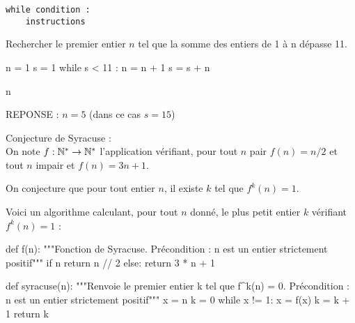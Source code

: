 \begin{lstlisting}
while condition :
    instructions
\end{lstlisting}



\vspace{0.5cm}
\label{ex-suite}
Rechercher le premier entier $n$ tel que la somme des entiers de 1 à n dépasse 11.

\begin{pyconsole}
n = 1
s = 1
while s < 11 :
    n = n + 1
    s = s + n
    
n
\end{pyconsole}

\begin{center}
REPONSE  : $n=5$  (dans ce cas $s=15$)
\end{center}



\label{ex-syracuse} Conjecture de Syracuse :\\
On note $f : \mathbb{N}^{*} \to \mathbb{N}^{*}$ l'application vérifiant, pour tout $n$ pair
$f(n)=n/2$ et tout $n$ impair et $f(n)=3n+1$.

On conjecture que pour tout entier $n$, il existe $k$ tel que
$f^{k}(n)=1$.

Voici un algorithme calculant, pour tout $n$ donné, le plus petit
entier $k$ vérifiant $f^{k}(n) = 1$ :


\begin{pyverbatim}
def f(n):
    """Fonction de Syracuse.
    Précondition : n est un entier strictement positif"""
    if n %
        return n // 2
    else:
        return 3 * n + 1
        
def syracuse(n):
    """Renvoie le premier entier k tel que  f^k(n) = 0.
    Précondition : n est un entier strictement positif"""
    x = n
    k = 0
    while x != 1:
        x = f(x)
        k = k + 1
    return k
\end{pyverbatim}


